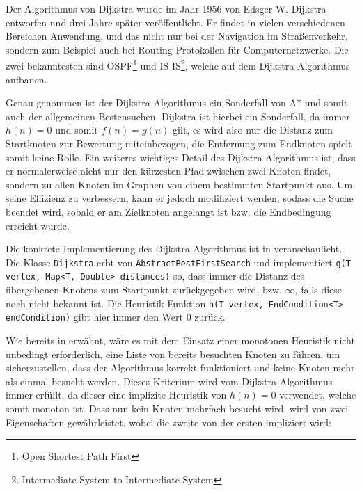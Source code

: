                 Der Algorithmus von Dijkstra wurde im Jahr 1956 von Edsger W. Dijkstra entworfen und drei Jahre später veröffentlicht. Er findet in vielen verschiedenen Bereichen Anwendung, und das nicht nur bei der Navigation im Straßenverkehr, sondern zum Beispiel auch bei Routing-Protokollen für Computernetzwerke. Die zwei bekanntesten sind OSPF\footnote{Open Shortest Path First} und IS-IS\footnote{Intermediate System to Intermediate System}, welche auf dem Dijkstra-Algorithmus aufbauen. \cite{EZ:Web48, EZ:Web49}
    
                Genau genommen ist der Dijkstra-Algorithmus ein Sonderfall von A* und somit auch der allgemeinen Bestensuchen. Dijkstra ist hierbei ein Sonderfall, da immer $h(n) = 0$ und somit $f(n) = g(n)$ gilt, es wird also nur die Distanz zum Startknoten zur Bewertung miteinbezogen, die Entfernung zum Endknoten spielt somit keine Rolle. Ein weiteres wichtiges Detail des Dijkstra-Algorithmus ist, dass er normalerweise nicht nur den kürzesten Pfad zwischen zwei Knoten findet, sondern zu allen Knoten im Graphen von einem bestimmten Startpunkt aus. Um seine Effizienz zu verbessern, kann er jedoch modifiziert werden, sodass die Suche beendet wird, sobald er am Zielknoten angelangt ist bzw. die Endbedingung erreicht wurde. \cite{EZ:Web08, EZ:Web51, EZ:Web52}
                
                Die konkrete Implementierung des Dijkstra-Algorithmus ist in  veranschaulicht. Die Klasse \lstinline{Dijkstra} erbt von \lstinline{AbstractBestFirstSearch} und implementiert \lstinline{g(T vertex, Map<T, Double> distances)} so,  dass immer die Distanz des übergebenen Knotens zum Startpunkt zurückgegeben wird, bzw. $\infty$, falls diese noch nicht bekannt ist. Die Heuristik-Funktion \lstinline{h(T vertex, EndCondition<T> endCondition)} gibt hier immer den Wert $0$ zurück.
                
                Wie bereits in  erwähnt, wäre es mit dem Einsatz einer monotonen Heuristik nicht unbedingt erforderlich, eine Liste von bereits besuchten Knoten zu führen, um sicherzustellen, dass der Algorithmus korrekt funktioniert und keine Knoten mehr als einmal besucht werden. Dieses Kriterium wird vom Dijkstra-Algorithmus immer erfüllt, da dieser eine implizite Heuristik von $h(n) = 0$ verwendet, welche somit monoton ist. Dass nun kein Knoten mehrfach besucht wird, wird von zwei Eigenschaften gewährleistet, wobei die zweite von der ersten impliziert wird:
                
